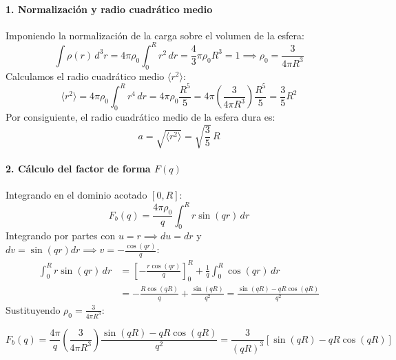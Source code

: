 \begin{problema}
\paragraph{1. Normalización y radio cuadrático medio}
Imponiendo la normalización de la carga sobre el volumen de la esfera:
\begin{equation}
    \int \rho(r) \, d^3r = 4\pi \rho_0 \int_0^R r^2 \, dr = \frac{4}{3}\pi \rho_0 R^3 = 1 \implies \rho_0 = \frac{3}{4\pi R^3}
\end{equation}
Calculamos el radio cuadrático medio $\langle r^2 \rangle$:
\begin{equation}
    \langle r^2 \rangle = 4\pi \rho_0 \int_0^R r^4 \, dr = 4\pi \rho_0 \frac{R^5}{5} = 4\pi \left( \frac{3}{4\pi R^3} \right) \frac{R^5}{5} = \frac{3}{5} R^2
\end{equation}
Por consiguiente, el radio cuadrático medio de la esfera dura es:
\begin{equation}
    a = \sqrt{\langle r^2 \rangle} = \sqrt{\frac{3}{5}} \, R
\end{equation}

\paragraph{2. Cálculo del factor de forma $F(q)$}
Integrando en el dominio acotado $[0, R]$:
\begin{equation}
    F_b(q) = \frac{4\pi \rho_0}{q} \int_0^R r \sin(qr) \, dr
\end{equation}
Integrando por partes con $u = r \implies du = dr$ y $dv = \sin(qr)dr \implies v = -\frac{\cos(qr)}{q}$:
\begin{align}
    \int_0^R r \sin(qr) \, dr &= \left[ -\frac{r \cos(qr)}{q} \right]_0^R + \frac{1}{q} \int_0^R \cos(qr) \, dr \nonumber \\
    &= -\frac{R \cos(qR)}{q} + \frac{\sin(qR)}{q^2} = \frac{\sin(qR) - qR\cos(qR)}{q^2}
\end{align}
Sustituyendo $\rho_0 = \frac{3}{4\pi R^3}$:
\begin{concepto}
\begin{equation}
    F_b(q) = \frac{4\pi}{q} \left( \frac{3}{4\pi R^3} \right) \frac{\sin(qR) - qR\cos(qR)}{q^2} = \frac{3}{(qR)^3} \left[ \sin(qR) - qR\cos(qR) \right]
\end{equation}
\end{concepto}


\end{problema}
